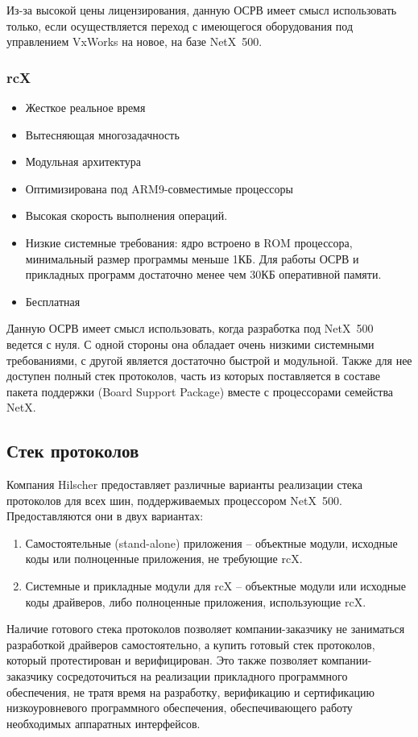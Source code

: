 \documentclass[a4paper,14pt,bachelor]{disser}
\begin{document}
Из-за высокой цены лицензирования, данную ОСРВ имеет смысл использовать только, если осуществляется переход с имеющегося оборудования под управлением VxWorks на новое, на базе NetX~500.

\subsubsection{rcX}
\begin{itemize}
 \item Жесткое реальное время
 \item Вытесняющая многозадачность
 \item Модульная архитектура
 \item Оптимизирована под ARM9-совместимые процессоры
 \item Высокая скорость выполнения операций.
 \item Низкие системные требования: ядро встроено в ROM процессора, минимальный размер программы меньше 1КБ. Для работы ОСРВ и прикладных программ достаточно менее чем 30КБ оперативной памяти.
 \item Бесплатная
\end{itemize}

Данную ОСРВ имеет смысл использовать, когда разработка под NetX~500 ведется с нуля. С одной стороны она обладает очень низкими системными требованиями, с другой является достаточно быстрой и модульной. Также для нее доступен полный стек протоколов, часть из которых поставляется в составе пакета поддержки (Board Support Package) вместе с процессорами семейства NetX.

\subsection{Стек протоколов}
Компания Hilscher предоставляет различные варианты реализации стека протоколов для всех шин, поддерживаемых процессором NetX~500. Предоставляются они в двух вариантах:
\begin{enumerate}
 \item Самостоятельные (stand-alone) приложения -- объектные модули, исходные коды или полноценные приложения, не требующие rcX.
 \item Системные и прикладные модули для rcX -- объектные модули или исходные коды драйверов, либо полноценные приложения, использующие rcX.
\end{enumerate}

Наличие готового стека протоколов позволяет компании-заказчику не заниматься разработкой драйверов самостоятельно, а купить готовый стек протоколов, который протестирован и верифицирован. Это также позволяет компании-заказчику сосредоточиться на реализации прикладного программного обеспечения, не тратя время на разработку, верификацию и сертификацию низкоуровневого программного обеспечения, обеспечивающего работу необходимых аппаратных интерфейсов.
\end{document}
